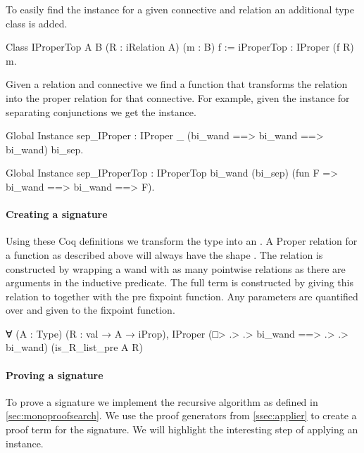\documentclass[thesis.tex]{subfiles}
\begin{document}
To easily find the  instance for a given connective and relation an additional type class is added.
\begin{coqcode}
  Class IProperTop {A} {B} 
                   (R : iRelation A) (m : B) 
                   f := iProperTop : IProper (f R) m.
\end{coqcode}
Given a relation  and connective  we find a function  that transforms the relation into the proper relation for that connective. For example, given the  instance for separating conjunctions we get the  instance.
\begin{coqcode}
  Global Instance sep_IProper : 
    IProper _ (bi_wand ==> bi_wand ==> bi_wand) 
             bi_sep.

  Global Instance sep_IProperTop : 
    IProperTop bi_wand (bi_sep) 
               (fun F => bi_wand ==> bi_wand ==> F).
\end{coqcode}

\paragraph{Creating a signature}
Using these Coq definitions we transform the type into an . A Proper relation for a function as described above will always have the shape . The relation  is constructed by wrapping a wand with as many pointwise relations as there are arguments in the inductive predicate. The full  term is constructed by giving this relation to  together with the pre fixpoint function. Any parameters are quantified over and given to the fixpoint function.
\begin{coqcode}
  ∀ (A : Type) (R : val → A → iProp),
    IProper (□> .> .> bi_wand ==> .> .> bi_wand) 
            (is_R_list_pre A R)
\end{coqcode}

\paragraph{Proving a signature}
To prove a signature we implement the recursive algorithm as defined in \cref{sec:monoproofsearch}. We use the proof generators from \cref{ssec:applier} to create a proof term for the signature. We will highlight the interesting step of applying an  instance.
\end{document}
